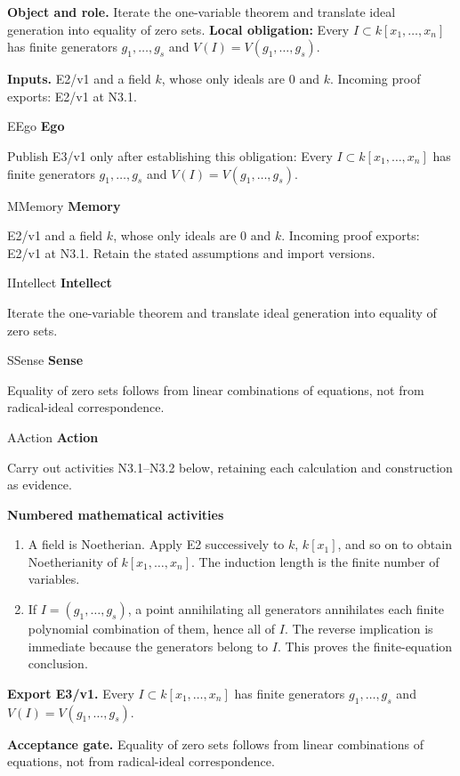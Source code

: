 \documentclass[preprint,12pt,aps,pra,showkeys,amsmath,amssymb,superscriptaddress,floatfix]{revtex4-2}
\theoremstyle{definition}
\theoremstyle{remark}
\newcommand{\mmfaculty}[3]{%
 \begin{mmfacultybox}{#1}{#2}
 {\sffamily\bfseries\color{MMBlue}#2}\par\smallskip #3
 \end{mmfacultybox}}
\newcommand{\field}[2]{\par\smallskip\noindent\textbf{#1.} #2\par}
\begin{document}
\field{Object and role}{Iterate the one-variable theorem and translate ideal generation into
equality of zero sets. \textbf{Local obligation:} Every
\(I\subset k[x_1,\ldots,x_n]\) has finite generators \(g_1,\ldots,g_s\)
and \(V(I)=V(g_1,\ldots,g_s)\).}

\field{Inputs}{E2/v1 and a field \(k\), whose only ideals are \(0\) and \(k\). Incoming
proof exports: E2/v1 at N3.1.}

\mmfaculty{E}{Ego}{Publish E3/v1 only after establishing this obligation: Every
\(I\subset k[x_1,\ldots,x_n]\) has finite generators \(g_1,\ldots,g_s\)
and \(V(I)=V(g_1,\ldots,g_s)\).}

\mmfaculty{M}{Memory}{E2/v1 and a field \(k\), whose only ideals are \(0\) and \(k\). Incoming
proof exports: E2/v1 at N3.1. Retain the stated assumptions and import
versions.}

\mmfaculty{I}{Intellect}{Iterate the one-variable theorem and translate ideal generation into
equality of zero sets.}

\mmfaculty{S}{Sense}{Equality of zero sets follows from linear combinations of equations, not
from radical-ideal correspondence.}

\mmfaculty{A}{Action}{Carry out activities N3.1--N3.2 below, retaining each calculation and
construction as evidence.}

\smallskip\noindent\textbf{Numbered mathematical activities}

\begin{enumerate}[label=N3.\arabic*,leftmargin=3.4em]

\item A field is Noetherian. Apply E2 successively to \(k\), \(k[x_1]\), and
so on to obtain Noetherianity of \(k[x_1,\ldots,x_n]\). The induction
length is the finite number of variables.

\item If \(I=(g_1,\ldots,g_s)\), a point annihilating all generators
annihilates each finite polynomial combination of them, hence all of
\(I\). The reverse implication is immediate because the generators
belong to \(I\). This proves the finite-equation conclusion.

\end{enumerate}

\field{Export E3/v1}{Every \(I\subset k[x_1,\ldots,x_n]\) has finite generators
\(g_1,\ldots,g_s\) and \(V(I)=V(g_1,\ldots,g_s)\).}

\field{Acceptance gate}{Equality of zero sets follows from linear combinations of equations, not
from radical-ideal correspondence.}
\end{document}
